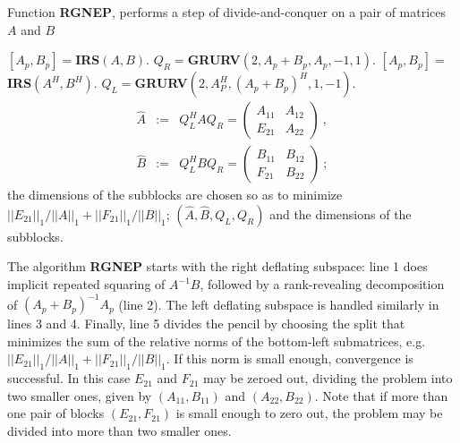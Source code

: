 \documentclass{article}
\theoremstyle{definition}
\begin{document}
\begin{algorithm}[ht!]
\protect\caption{Function \textbf{RGNEP}, performs a step of divide-and-conquer on a pair of matrices $A$ and $B$}
\begin{algorithmic}[1]
\label{rgnep}
\STATE $[A_p, B_p] = $\textbf{IRS}$(A,B)$.
\STATE $Q_R = $\textbf{GRURV}$(2, A_p+B_p, A_p, -1, 1)$.
\STATE $[A_p, B_p] = $\textbf{IRS}$(A^{H}, B^{H})$.
\STATE $Q_L = $\textbf{GRURV}$(2, A_P^{H}, (A_p+B_p)^{H}, 1, -1)$. 
\STATE \begin{eqnarray} \label{unu} \hat{A} &:=& Q_L^{H} A Q_R = \left ( \begin{array}{cc} A_{11} & A_{12} \\ E_{21} & A_{22} \end{array} \right )~,\\ 
\label{doi} \hat{B} &:=& Q_L^H BQ_R = \left ( \begin{array}{cc} B_{11} & B_{12} \\ F_{21} & B_{22} \end{array} \right )~;
\end{eqnarray} 
the dimensions of the subblocks are chosen so as to minimize $||E_{21}||_1/||A||_1+||F_{21}||_1/||B||_1$;
\RETURN $(\hat{A}, \hat{B}, Q_L, Q_R)$ and the dimensions of the subblocks.
\end{algorithmic}
\end{algorithm}

\vspace{.35cm}

The algorithm \textbf{RGNEP} starts with the right deflating subspace:
line 1 does implicit repeated squaring of $A^{-1}B$,
followed by a rank-revealing decomposition of $(A_p+B_p)^{-1}A_p$ (line 2).
The left deflating subspace is handled similarly in lines 3 and 4.
Finally, line 5 divides the pencil by choosing the split that minimizes the sum 
of the relative norms of the bottom-left submatrices, 
e.g. $||E_{21}||_1/||A||_1+||F_{21}||_1/||B||_1$. 
If this norm is small enough, convergence is successful.  In this case
$E_{21}$ and $F_{21}$ may be zeroed out, dividing the problem into
two smaller ones, given by $(A_{11},B_{11})$ and $(A_{22},B_{22})$.
Note that if more than one pair of blocks $(E_{21},F_{21})$ is small enough
to zero out, the problem may be divided into more than two smaller ones.
\end{document}
